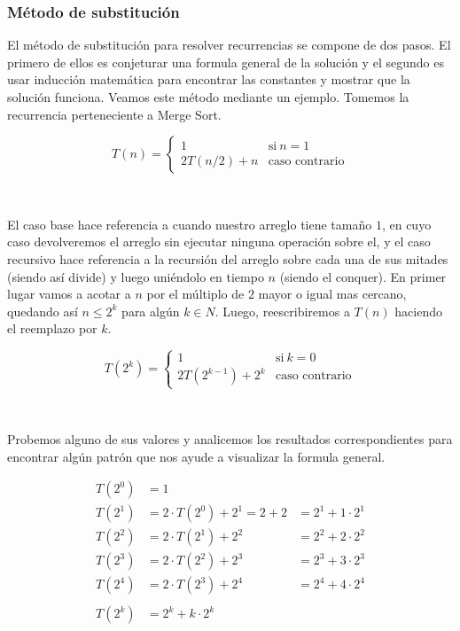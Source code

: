 \subsubsection{M\'etodo de substituci\'on}

El m\'etodo de substituci\'on para resolver recurrencias se compone de dos pasos. El primero de ellos es conjeturar una formula general de la soluci\'on y el segundo es usar inducci\'on matem\'atica para encontrar las constantes y mostrar que la soluci\'on funciona. Veamos este m\'etodo mediante un ejemplo. Tomemos la recurrencia perteneciente a Merge Sort.

\begin{equation*}
  T(n) = \begin{cases}
	      1         		& \text{si} \ n = 1 \\
	      2T(n/2) + n         	& \text{caso contrario}
	  \end{cases}
\end{equation*}

~

El caso base hace referencia a cuando nuestro arreglo tiene tama\~no $1$, en cuyo caso devolveremos el arreglo sin ejecutar ninguna operaci\'on sobre el, y el caso recursivo hace referencia a la recursi\'on del arreglo sobre cada una de sus mitades (siendo as\'i divide) y luego uni\'endolo en tiempo $n$ (siendo el conquer). En primer lugar vamos a acotar a $n$ por el m\'ultiplo de $2$ mayor o igual mas cercano, quedando as\'i $n \leq 2^k$ para alg\'un $k \in N$. Luego, reescribiremos a $T(n)$ haciendo el reemplazo por $k$.

\begin{equation*}
  T(2^k) = \begin{cases}
	      1         		& \text{si} \ k = 0 \\
	      2T(2^{k-1}) + 2^k        	& \text{caso contrario}
	  \end{cases}
\end{equation*}

~

Probemos alguno de sus valores y analicemos los resultados correspondientes para encontrar alg\'un patr\'on que nos ayude a visualizar la formula general.

\begin{align*}
 T(2^0) & = 1 \\
 T(2^1) & = 2 \cdot T(2^0) + 2^1 = 2 + 2 & = 2^1 + 1 \cdot 2^1 \\
 T(2^2) & = 2 \cdot T(2^1) + 2^2 & = 2^2 + 2 \cdot 2^2 \\
 T(2^3) & = 2 \cdot T(2^2) + 2^3 &= 2^3 + 3 \cdot 2^3 \\
 T(2^4) & = 2 \cdot T(2^3) + 2^4 &= 2^4 + 4 \cdot 2^4 \\ \\
 T(2^k) & = 2^k + k \cdot 2^k
\end{align*}

